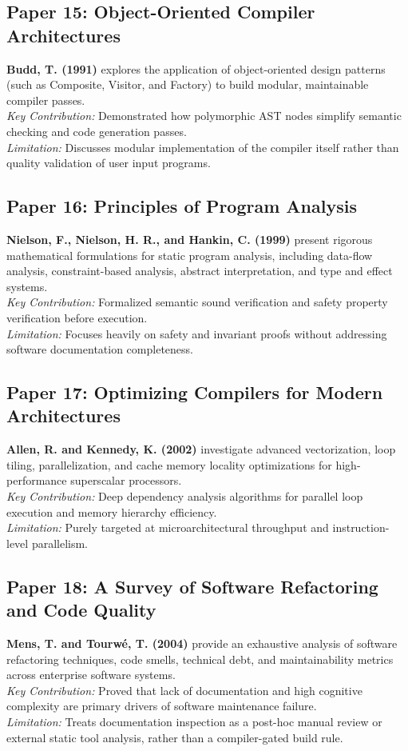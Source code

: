 \subsection{Paper 15: Object-Oriented Compiler Architectures}
\textbf{Budd, T. (1991)} \cite{budd1991object} explores the application of object-oriented design patterns (such as Composite, Visitor, and Factory) to build modular, maintainable compiler passes. \\
\textit{Key Contribution:} Demonstrated how polymorphic AST nodes simplify semantic checking and code generation passes. \\
\textit{Limitation:} Discusses modular implementation of the compiler itself rather than quality validation of user input programs.

\subsection{Paper 16: Principles of Program Analysis}
\textbf{Nielson, F., Nielson, H. R., and Hankin, C. (1999)} \cite{nielson1999principles} present rigorous mathematical formulations for static program analysis, including data-flow analysis, constraint-based analysis, abstract interpretation, and type and effect systems. \\
\textit{Key Contribution:} Formalized semantic sound verification and safety property verification before execution. \\
\textit{Limitation:} Focuses heavily on safety and invariant proofs without addressing software documentation completeness.

\subsection{Paper 17: Optimizing Compilers for Modern Architectures}
\textbf{Allen, R. and Kennedy, K. (2002)} \cite{allen2002optimizing} investigate advanced vectorization, loop tiling, parallelization, and cache memory locality optimizations for high-performance superscalar processors. \\
\textit{Key Contribution:} Deep dependency analysis algorithms for parallel loop execution and memory hierarchy efficiency. \\
\textit{Limitation:} Purely targeted at microarchitectural throughput and instruction-level parallelism.

\subsection{Paper 18: A Survey of Software Refactoring and Code Quality}
\textbf{Mens, T. and Tourwé, T. (2004)} \cite{mens2004survey} provide an exhaustive analysis of software refactoring techniques, code smells, technical debt, and maintainability metrics across enterprise software systems. \\
\textit{Key Contribution:} Proved that lack of documentation and high cognitive complexity are primary drivers of software maintenance failure. \\
\textit{Limitation:} Treats documentation inspection as a post-hoc manual review or external static tool analysis, rather than a compiler-gated build rule.

